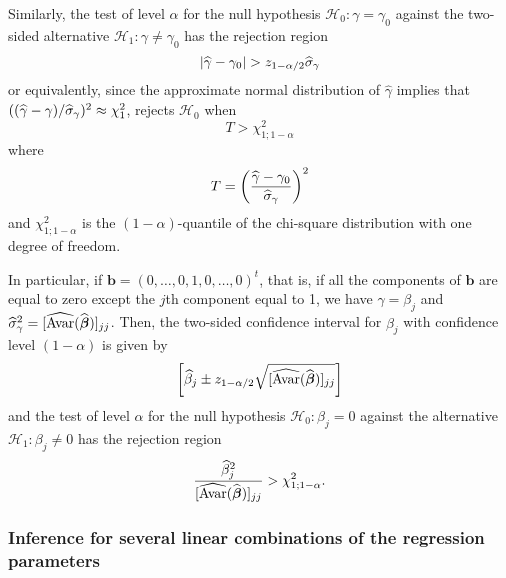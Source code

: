 Similarly, the test of level $\alpha$ for the null hypothesis $\mathcal{H}_0:
\gamma = \gamma_0$ against the two-sided alternative $\mathcal{H}_1: \gamma
\neq \gamma_0$ has the rejection region
\[
    |\widehat{\gamma}-\gamma_0| > z_{1-\alpha/2}\widehat{\sigma}_\gamma
\]
or equivalently, since the approximate normal distribution of
$\widehat{\gamma}$ implies that
$((\widehat{\gamma}-\gamma)/\widehat{\sigma}_\gamma)^2 \approx \chi_1^2$, rejects
$\mathcal{H}_{0}$ when
\[
    T > \chi_{1; 1-\alpha}^2
\]
where
\[
    T = \left(\frac{\sthat{\gamma}-\gamma_0}{\sthat{\sigma}_\gamma}\right)^2
\]
and $\chi_{1;1-\alpha}^2$ is the $(1-\alpha)$-quantile of the chi-square
distribution with one degree of freedom.

In particular, if $\mathbf{b} = (0, \dots, 0, 1, 0, \dots, 0)^t$, that is, if
all the components of $\mathbf{b}$ are equal to zero except the $j$th component
equal to 1, we have $\gamma = \beta_j$ and $\widehat{\sigma}_\gamma^2 =
[\widehat{\mathrm{Avar}}(\widehat{\boldsymbol\beta})]_{jj}$. Then, the two-sided
confidence interval for $\beta_j$ with confidence level $(1-\alpha)$ is given by
\[
    \left[\sthat{\beta}_j \pm 
    z_{1-\alpha/2} \sqrt{[\sthat{\mathrm{Avar}}(\sthat{\boldsymbol\beta})]_{jj}}\right]
\]
and the test of level $\alpha$ for the null hypothesis $\mathcal{H}_0: \beta_j =
0$ against the alternative $\mathcal{H}_1: \beta_j \neq 0$ has the rejection
region
\[
    \frac{\widehat{\beta}_j^2}{[\widehat{\mathrm{Avar}}(\widehat{\boldsymbol\beta})]_{jj}} 
    > \chi_{1;1-\alpha}^2.
\]

\subsubsection{Inference for several linear combinations of the regression parameters}

